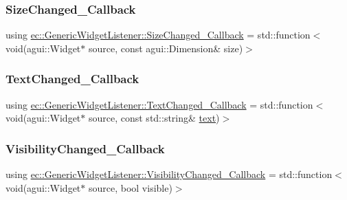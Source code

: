 \mbox{\label{classec_1_1_generic_widget_listener_aa47779ac982662cd4466132fa13fae68}} 
\subsubsection{\texorpdfstring{Size\+Changed\+\_\+\+Callback}{SizeChanged\_Callback}}
{\footnotesize\ttfamily using \mbox{\hyperlink{classec_1_1_generic_widget_listener_aa47779ac982662cd4466132fa13fae68}{ec\+::\+Generic\+Widget\+Listener\+::\+Size\+Changed\+\_\+\+Callback}} =  std\+::function$<$void(agui\+::\+Widget$\ast$ source, const agui\+::\+Dimension\& size)$>$}

\mbox{\label{classec_1_1_generic_widget_listener_a1aca43f34a5ccb594026e6acda4236f5}} 
\subsubsection{\texorpdfstring{Text\+Changed\+\_\+\+Callback}{TextChanged\_Callback}}
{\footnotesize\ttfamily using \mbox{\hyperlink{classec_1_1_generic_widget_listener_a1aca43f34a5ccb594026e6acda4236f5}{ec\+::\+Generic\+Widget\+Listener\+::\+Text\+Changed\+\_\+\+Callback}} =  std\+::function$<$void(agui\+::\+Widget$\ast$ source, const std\+::string\& \mbox{\hyperlink{namespaceec_a0bdee24285d69deca899e166b29c0150}{text}})$>$}

\mbox{\label{classec_1_1_generic_widget_listener_aff589de061ea44ef90ab0fb63ad92477}} 
\subsubsection{\texorpdfstring{Visibility\+Changed\+\_\+\+Callback}{VisibilityChanged\_Callback}}
{\footnotesize\ttfamily using \mbox{\hyperlink{classec_1_1_generic_widget_listener_aff589de061ea44ef90ab0fb63ad92477}{ec\+::\+Generic\+Widget\+Listener\+::\+Visibility\+Changed\+\_\+\+Callback}} =  std\+::function$<$void(agui\+::\+Widget$\ast$ source, bool visible)$>$}




